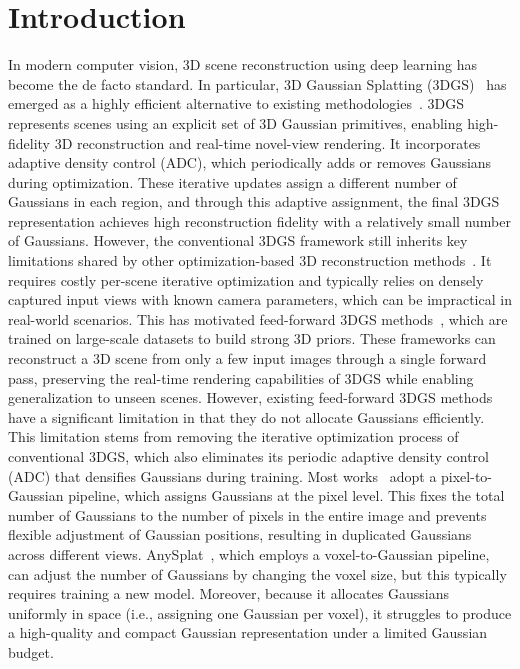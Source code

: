 \section{Introduction}

In modern computer vision,  3D scene reconstruction using deep learning has become the de facto standard. In particular, 3D Gaussian Splatting (3DGS)~\cite{kerbl20233dgs} has emerged as a highly efficient alternative to existing methodologies~\cite{mescheder2019occupancynetworks, park2019deepsdf, fridovich2022plenoxels, muller2022instant}. 3DGS represents scenes using an explicit set of 3D Gaussian primitives, enabling high-fidelity 3D reconstruction and real-time novel-view rendering.
It incorporates adaptive density control (ADC), which periodically adds or removes Gaussians during optimization. These iterative updates assign a different number of Gaussians in each region, and through this adaptive assignment, the final 3DGS representation achieves high reconstruction fidelity with a relatively small number of Gaussians.
However, the conventional 3DGS framework still inherits key limitations shared by other optimization-based 3D reconstruction methods~\cite{mildenhall2021nerf, fridovich2022plenoxels, muller2022instant}. 
It requires costly per-scene iterative optimization and typically relies on densely captured input views with known camera parameters, which can be impractical in real-world scenarios. 
This has motivated feed-forward 3DGS methods~\cite{charatan2024pixelsplat, chen2024mvsplat, xu2025depthsplat, ye2024nopo, li2025vicasplat, huang2025spfsplat, jiang2025anysplat}, which are trained on large-scale datasets to build strong 3D priors. These frameworks can reconstruct a 3D scene from only a few input images through a single forward pass, preserving the real-time rendering capabilities of 3DGS while enabling generalization to unseen scenes. 
However, existing feed-forward 3DGS methods have a significant limitation in that they do not allocate Gaussians efficiently. This limitation stems from removing the iterative optimization process of conventional 3DGS, which also eliminates its periodic adaptive density control (ADC) that densifies Gaussians during training.
Most works~\cite{charatan2024pixelsplat, chen2024mvsplat, xu2025depthsplat, ye2024nopo, li2025vicasplat, zhang2025flare, huang2025spfsplat} adopt a pixel-to-Gaussian pipeline, which assigns Gaussians at the pixel level. This fixes the total number of Gaussians to the number of pixels in the entire image and prevents flexible adjustment of Gaussian positions, resulting in duplicated Gaussians across different views. AnySplat~\cite{jiang2025anysplat}, which employs a voxel-to-Gaussian pipeline, can adjust the number of Gaussians by changing the voxel size, but this typically requires training a new model. Moreover, because it allocates Gaussians uniformly in space (i.e., assigning one Gaussian per voxel), it struggles to produce a high-quality and compact Gaussian representation under a limited Gaussian budget.

